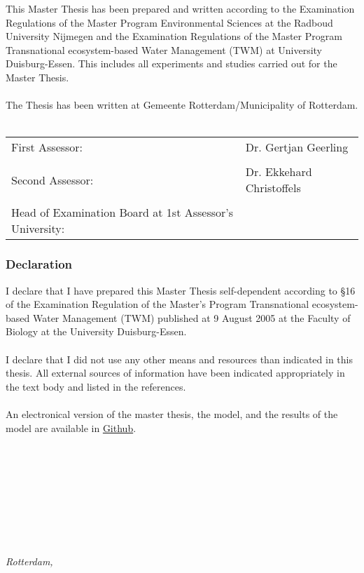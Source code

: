 \newpage
\noindent
This Master Thesis has been prepared and written according to the Examination Regulations of the Master Program Environmental Sciences at the Radboud University Nijmegen and the Examination Regulations of the Master Program Transnational ecosystem-based Water Management (TWM) at University Duisburg-Essen. This includes all experiments and studies carried out for the Master Thesis. \\
\\
The Thesis has been written at Gemeente Rotterdam/Municipality of Rotterdam. \\
\\

\begin{tabular}{ll}
    First Assessor: & Dr. Gertjan Geerling\\
    \\
    Second Assessor: & Dr. Ekkehard Christoffels \\
    \\
    Head of Examination Board at 1st Assessor's University: &                     \\
\end{tabular}
\newpage
\subsubsection{Declaration}
I declare that I have prepared this Master Thesis self-dependent according to §16 of the Examination Regulation of the Master's Program Transnational ecosystem-based Water Management (TWM) published at 9 August 2005 at the Faculty of Biology at the University Duisburg-Essen. \\
\\
I declare that I did not use any other means and resources than indicated in this thesis. All external sources of information have been indicated appropriately in the text body and listed in the references. \\
\\
An electronical version of the master thesis, the model, and the results of the model are available in \href{https://github.com/hannahwillemijn9/GWMNO-Rotterdam.git}{Github}.
\\
\\
\\
\\
\\
\\
\\
\\
\begin{flushright}
{\makeatletter\itshape
    \@author \\
    Rotterdam, \monthname{} \the\year{}
\makeatother}
\end{flushright}








